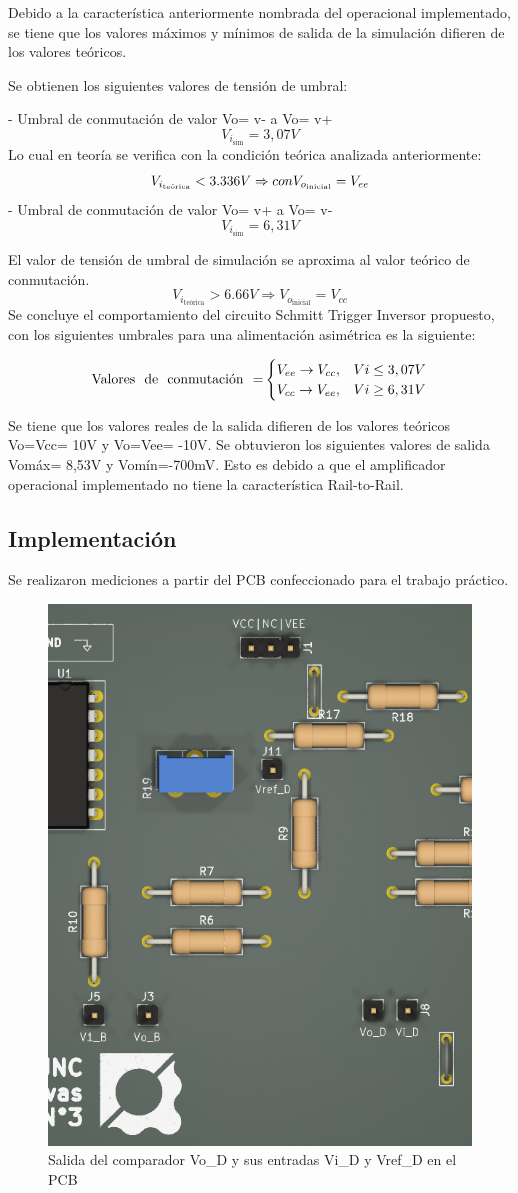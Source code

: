 Debido a la característica anteriormente nombrada del operacional implementado, se tiene que los valores máximos y mínimos de salida de la simulación difieren de los valores teóricos.

Se obtienen los siguientes valores de tensión de umbral:

- Umbral de conmutación de valor Vo= v- a Vo= v+ 
\[V_{i_{\text{sim}}}= 3,07V\]
Lo cual en teoría se verifica con la condición teórica analizada anteriormente:
\[V_{i_{\text{teórica}}} < 3.336V \Rightarrow con \space V_{o_{\text{inicial}}} = V_{ee}\]
- Umbral de conmutación de valor Vo= v+ a Vo= v- 
\[V_{i_{\text{sim}}}= 6,31V\]

El valor de tensión de umbral de simulación se aproxima al valor teórico de conmutación.
\[V_{i_{\text{teórica}}} > 6.66V \Rightarrow V_{o_{\text{inicial}}}= V_{cc} \]
Se concluye el comportamiento del circuito Schmitt Trigger Inversor propuesto, con los siguientes umbrales para una alimentación asimétrica es la siguiente:

\begin{equation}
    \text{Valores \space de \space conmutación \space =}
    \begin{cases}
      V_{ee} \rightarrow V_{cc}, &  Vi\leq3,07V \\
      V_{cc} \rightarrow V_{ee}, &  Vi\geq6,31V
    \end{cases}
  \end{equation}
  
Se tiene que los valores reales de la salida difieren de los valores teóricos Vo=Vcc= 10V y Vo=Vee= -10V. Se obtuvieron los siguientes valores de salida Vomáx= 8,53V y Vomín=-700mV.  Esto es debido a que el amplificador operacional implementado no tiene la característica Rail-to-Rail. 

\subsection{Implementación}

Se realizaron mediciones a partir del PCB confeccionado para el trabajo práctico.

\begin{figure}[H]
    \centering
    \includegraphics[width=0.5\linewidth]{Secciones//Circuito4/pcb4.png}
        \caption{Salida del comparador Vo\_D y sus entradas Vi\_D y Vref\_D en el PCB}
    \label{fig:enter-label}
\end{figure}

